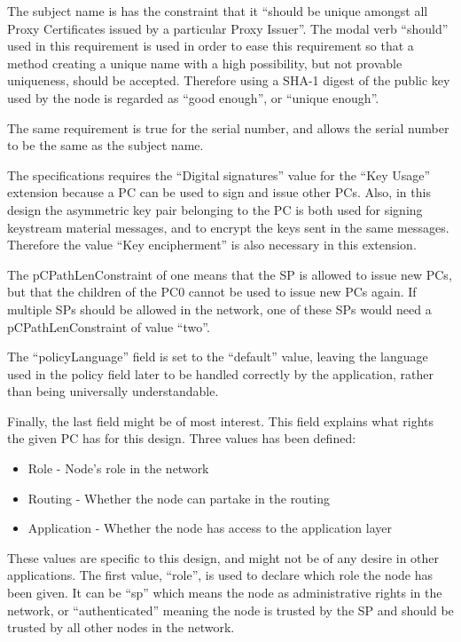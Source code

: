 The subject name is has the constraint that it ``should be unique amongst all
Proxy Certificates issued by a particular Proxy Issuer''. The modal verb
``should'' used in this requirement is used in order to ease this requirement so
that a method creating a unique name with a high possibility, but not provable
uniqueness, should be accepted. Therefore using a SHA-1 digest of the public key
used by the node is regarded as ``good enough'', or ``unique enough''.

The same requirement is true for the serial number, and allows the serial number
to be the same as the subject name.

The specifications requires the ``Digital signatures'' value for the ``Key
Usage'' extension because a \ac{PC} can be used to sign and issue other
\acp{PC}. Also, in this design the asymmetric key pair belonging to the \ac{PC}
is both used for signing keystream material messages, and to encrypt the keys
sent in the same messages. Therefore the value ``Key encipherment'' is also
necessary in this extension.

The pCPathLenConstraint of one means that the \ac{SP} is allowed to issue new
\acp{PC}, but that the children of the \ac{PC0} cannot be used to issue new
\acp{PC} again. If multiple \acp{SP} should be allowed in the network, one of
these \acp{SP} would need a pCPathLenConstraint of value ``two''.

The ``policyLanguage'' field is set to the ``default'' value, leaving the
language used in the policy field later to be handled correctly by the
application, rather than being universally understandable.

Finally, the last field might be of most interest. This field explains what
rights the given \ac{PC} has for this design. Three values has been defined:

\begin{itemize}
  \item Role - Node's role in the network
  \item Routing - Whether the node can partake in the routing
  \item Application - Whether the node has access to the application layer
\end{itemize}

These values are specific to this design, and might not be of any desire in
other applications. The first value, ``role'', is used to declare which role the
node has been given. It can be ``sp'' which means the node as administrative
rights in the network, or ``authenticated'' meaning the node is trusted by the
\ac{SP} and should be trusted by all other nodes in the network.

